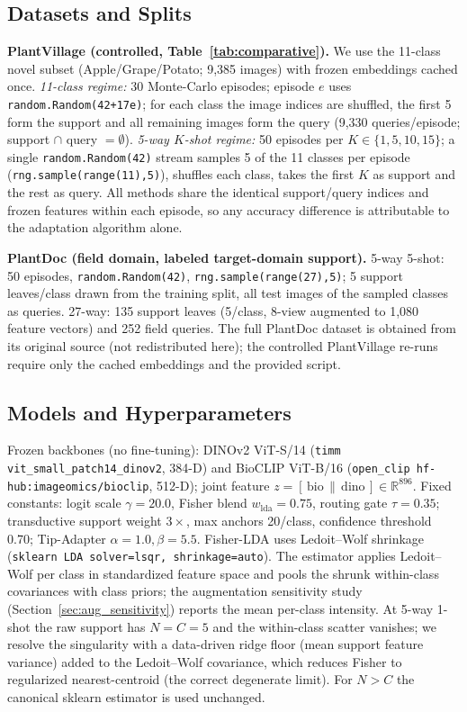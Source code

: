 \documentclass[preprint,12pt]{elsarticle}
\begin{document}
\subsection{Datasets and Splits}
\textbf{PlantVillage (controlled, Table~\ref{tab:comparative}).} We use the 11-class novel subset (Apple/Grape/Potato; 9{,}385 images) with frozen embeddings cached once. \emph{11-class regime:} 30 Monte-Carlo episodes; episode $e$ uses \texttt{random.Random(42+17e)}; for each class the image indices are shuffled, the first 5 form the support and all remaining images form the query (9{,}330 queries/episode; support $\cap$ query $=\emptyset$). \emph{5-way $K$-shot regime:} 50 episodes per $K\in\{1,5,10,15\}$; a single \texttt{random.Random(42)} stream samples 5 of the 11 classes per episode (\texttt{rng.sample(range(11),5)}), shuffles each class, takes the first $K$ as support and the rest as query. All methods share the identical support/query indices and frozen features within each episode, so any accuracy difference is attributable to the adaptation algorithm alone.

\textbf{PlantDoc (field domain, labeled target-domain support).} 5-way 5-shot: 50 episodes, \texttt{random.Random(42)}, \texttt{rng.sample(range(27),5)}; 5 support leaves/class drawn from the training split, all test images of the sampled classes as queries. 27-way: 135 support leaves (5/class, 8-view augmented to 1{,}080 feature vectors) and 252 field queries. The full PlantDoc dataset is obtained from its original source (not redistributed here); the controlled PlantVillage re-runs require only the cached embeddings and the provided script.

\subsection{Models and Hyperparameters}
Frozen backbones (no fine-tuning): DINOv2 ViT-S/14 (\texttt{timm vit\_small\_patch14\_dinov2}, 384-D) and BioCLIP ViT-B/16 (\texttt{open\_clip hf-hub:imageomics/bioclip}, 512-D); joint feature $z=[\,\text{bio}\,\|\,\text{dino}\,]\in\mathbb{R}^{896}$. Fixed constants: logit scale $\gamma=20.0$, Fisher blend $w_{\text{lda}}=0.75$, routing gate $\tau=0.35$; transductive support weight $3\times$, max anchors 20/class, confidence threshold 0.70; Tip-Adapter $\alpha=1.0,\beta=5.5$. Fisher-LDA uses Ledoit--Wolf shrinkage (\texttt{sklearn LDA solver=lsqr, shrinkage=auto}). The estimator applies Ledoit--Wolf per class in standardized feature space and pools the shrunk within-class covariances with class priors; the augmentation sensitivity study (Section~\ref{sec:aug_sensitivity}) reports the mean per-class intensity. At 5-way 1-shot the raw support has $N=C=5$ and the within-class scatter vanishes; we resolve the singularity with a data-driven ridge floor (mean support feature variance) added to the Ledoit--Wolf covariance, which reduces Fisher to regularized nearest-centroid (the correct degenerate limit). For $N>C$ the canonical sklearn estimator is used unchanged.
\end{document}
